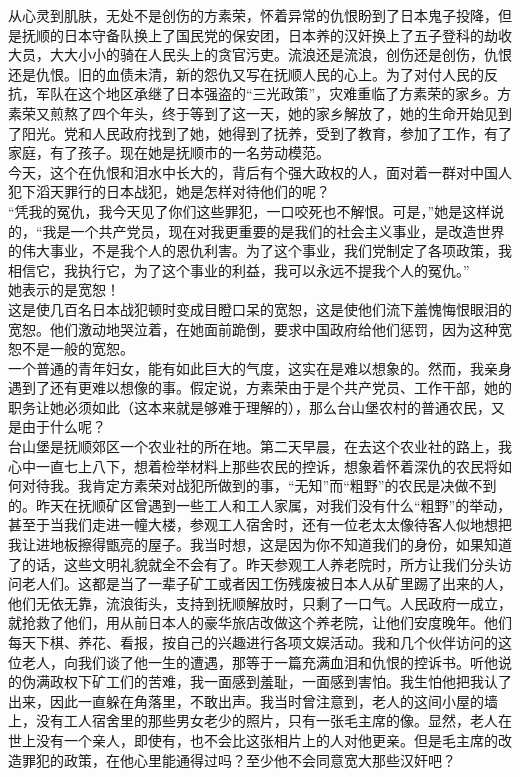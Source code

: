 从心灵到肌肤，无处不是创伤的方素荣，怀着异常的仇恨盼到了日本鬼子投降，但是抚顺的日本守备队换上了国民党的保安团，日本养的汉奸换上了五子登科的劫收大员，大大小小的骑在人民头上的贪官污吏。流浪还是流浪，创伤还是创伤，仇恨还是仇恨。旧的血债未清，新的怨仇又写在抚顺人民的心上。为了对付人民的反抗，军队在这个地区承继了日本强盗的“三光政策”，灾难重临了方素荣的家乡。方素荣又煎熬了四个年头，终于等到了这一天，她的家乡解放了，她的生命开始见到了阳光。党和人民政府找到了她，她得到了抚养，受到了教育，参加了工作，有了家庭，有了孩子。现在她是抚顺市的一名劳动模范。\\

今天，这个在仇恨和泪水中长大的，背后有个强大政权的人，面对着一群对中国人犯下滔天罪行的日本战犯，她是怎样对待他们的呢？\\

“凭我的冤仇，我今天见了你们这些罪犯，一口咬死也不解恨。可是，”她是这样说的，“我是一个共产党员，现在对我更重要的是我们的社会主义事业，是改造世界的伟大事业，不是我个人的恩仇利害。为了这个事业，我们党制定了各项政策，我相信它，我执行它，为了这个事业的利益，我可以永远不提我个人的冤仇。”\\

她表示的是宽恕！\\

这是使几百名日本战犯顿时变成目瞪口呆的宽恕，这是使他们流下羞愧悔恨眼泪的宽恕。他们激动地哭泣着，在她面前跪倒，要求中国政府给他们惩罚，因为这种宽恕不是一般的宽恕。\\

一个普通的青年妇女，能有如此巨大的气度，这实在是难以想象的。然而，我亲身遇到了还有更难以想像的事。假定说，方素荣由于是个共产党员、工作干部，她的职务让她必须如此（这本来就是够难于理解的），那么台山堡农村的普通农民，又是由于什么呢？\\

台山堡是抚顺郊区一个农业社的所在地。第二天早晨，在去这个农业社的路上，我心中一直七上八下，想着检举材料上那些农民的控诉，想象着怀着深仇的农民将如何对待我。我肯定方素荣对战犯所做到的事，“无知”而“粗野”的农民是决做不到的。昨天在抚顺矿区曾遇到一些工人和工人家属，对我们没有什么“粗野”的举动，甚至于当我们走进一幢大楼，参观工人宿舍时，还有一位老太太像待客人似地想把我让进地板擦得甑亮的屋子。我当时想，这是因为你不知道我们的身份，如果知道了的话，这些文明礼貌就全不会有了。昨天参观工人养老院时，所方让我们分头访问老人们。这都是当了一辈子矿工或者因工伤残废被日本人从矿里踢了出来的人，他们无依无靠，流浪街头，支持到抚顺解放时，只剩了一口气。人民政府一成立，就抢救了他们，用从前日本人的豪华旅店改做这个养老院，让他们安度晚年。他们每天下棋、养花、看报，按自己的兴趣进行各项文娱活动。我和几个伙伴访问的这位老人，向我们谈了他一生的遭遇，那等于一篇充满血泪和仇恨的控诉书。听他说的伪满政权下矿工们的苦难，我一面感到羞耻，一面感到害怕。我生怕他把我认了出来，因此一直躲在角落里，不敢出声。我当时曾注意到，老人的这间小屋的墙上，没有工人宿舍里的那些男女老少的照片，只有一张毛主席的像。显然，老人在世上没有一个亲人，即使有，也不会比这张相片上的人对他更亲。但是毛主席的改造罪犯的政策，在他心里能通得过吗？至少他不会同意宽大那些汉奸吧？\\

